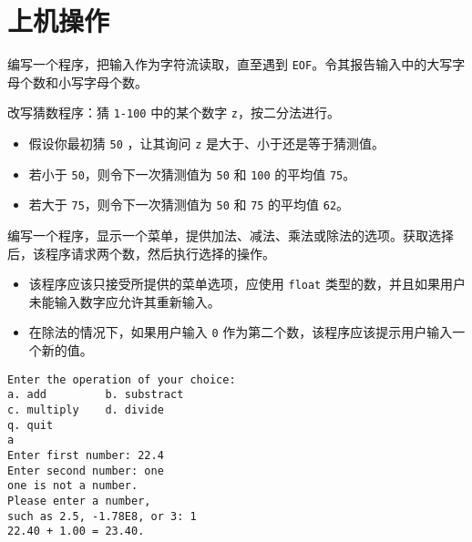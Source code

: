 \section{上机操作}

\begin{frame}[fragile]
\begin{free}[例]{}
编写一个程序，把输入作为字符流读取，直至遇到 \lstinline|EOF|。令其报告输入中的大写字母个数和小写字母个数。
\end{free}
\end{frame}

\begin{frame}[fragile]
\begin{free}[例]{}
改写猜数程序：猜 \lstinline|1-100| 中的某个数字 \lstinline|z|，按二分法进行。
\begin{itemize}
\item 
假设你最初猜 \lstinline|50| ，让其询问 \lstinline|z| 是大于、小于还是等于猜测值。
\item
若小于 \lstinline|50|，则令下一次猜测值为 \lstinline|50| 和 \lstinline|100| 的平均值 \lstinline|75|。
\item 
若大于 \lstinline|75|，则令下一次猜测值为 \lstinline|50| 和 \lstinline|75| 的平均值 \lstinline|62|。
\end{itemize}
\end{free}
\end{frame}

\begin{frame}[fragile]
\begin{free}[例]{}
编写一个程序，显示一个菜单，提供加法、减法、乘法或除法的选项。获取选择后，该程序请求两个数，然后执行选择的操作。
\begin{itemize}
\item 
该程序应该只接受所提供的菜单选项，应使用 \lstinline|float| 类型的数，并且如果用户未能输入数字应允许其重新输入。
\item
在除法的情况下，如果用户输入 \lstinline|0| 作为第二个数，该程序应该提示用户输入一个新的值。
\end{itemize}
\end{free}
\end{frame}

\begin{frame}[fragile]
\begin{lstlisting}
Enter the operation of your choice:
a. add         b. substract
c. multiply    d. divide
q. quit
a
Enter first number: 22.4
Enter second number: one
one is not a number.
Please enter a number,
such as 2.5, -1.78E8, or 3: 1
22.40 + 1.00 = 23.40.
\end{lstlisting}
\end{frame}

